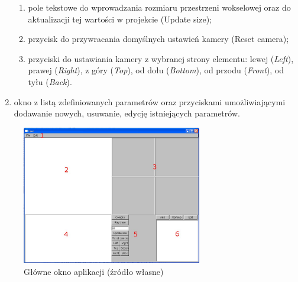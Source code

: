 \begin{enumerate}
\begin{enumerate}
    \item pole tekstowe do wprowadzania rozmiaru przestrzeni wokselowej oraz do
    aktualizacji tej wartości w projekcie (Update size);
    \item przycisk do przywracania domyślnych ustawień kamery (Reset camera);
    \item przyciski do ustawiania kamery z wybranej strony elementu: lewej
    (\emph{Left}), prawej (\emph{Right}), z góry (\emph{Top}), od dołu
    (\emph{Bottom}), od przodu (\emph{Front}), od tyłu (\emph{Back}).
  \end{enumerate}
  \item okno z listą zdefiniowanych parametrów oraz przyciskami umożliwiającymi
  dodawanie nowych, usuwanie, edycję istniejących parametrów.
\end{enumerate}

\begin{figure}[h]
  \centering
  \includegraphics[width=0.7\textwidth]{images/ui.jpg}
  \caption{Główne okno aplikacji (źródło własne)}
  \label{main_window}
\end{figure}

